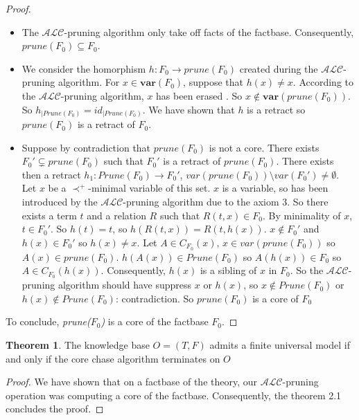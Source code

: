 \documentclass{article}
\theoremstyle{definition}
\newtheorem{theorem}{Theorem}[section]
\theoremstyle{remark}
\newcommand{\TodoDavid}[1]{\todo[color=green!40]{#1}}
\begin{document}
\begin{proof}
\begin{itemize}
\item The $\mathcal{ALC}$-pruning algorithm only take off facts of the factbase. Consequently, $\textit{prune}(F_0) \subseteq F_0$.
\item We consider the homorphism $h:F_0 \to \textit{prune}(F_0)$ created during the $\mathcal{ALC}$-pruning algorithm. For $x \in \textbf{var}(F_0)$, suppose that $h(x) \neq x$. According to the $\mathcal{ALC}$-pruning algorithm, $x$ has been erased \TodoDavid{à préciser}. So $x \notin \textbf{var}(\textit{prune}(F_0))$. So ${h}_{|\textit{Prune}(F_0)}=id_{|\textit{Prune}(F_0)}$. We have shown that $h$ is a retract so $\textit{prune}(F_0)$ is a retract of $F_0$.
\item Suppose by contradiction that $\textit{prune}(F_0)$ is not a core. There exists $F_0' \subsetneq \textit{prune}(F_0)$ such that $F_0'$ is a retract of $\textit{prune}(F_0)$. There exists then a retract $h_1: Prune(F_0) \to F_0'$, $var(prune(F_0))\setminus var(F_0') \neq \emptyset$. Let $x$ be a $\prec^+$-minimal variable of this set. $x$ is a variable, so has been introduced by the $\mathcal{ALC}$-pruning algorithm due to the axiom 3. So there exists a term $t$ and a relation $R$ such that $R(t,x) \in F_0$. By minimality of $x$, $t \in F_0'$. So $h(t) = t$, so $h(R(t,x)) = R(t,h(x))$. $x \notin F_0'$ and $h(x) \in F_0'$ so $h(x) \neq x$. Let $A \in C_{F_0}(x)$, $x \in var(prune(F_0))$ so $A(x) \in prune(F_0)$. $h(A(x)) \in Prune(F_0)$ so $A(h(x)) \in F_0$ so $A \in C_{F_0}(h(x))$. Consequently, $h(x)$ is a sibling of $x$ in $F_0$. So the $\mathcal{ALC}$-pruning algorithm should have suppress $x$ or $h(x)$, so $x \notin Prune(F_0)$ or $h(x) \notin Prune(F_0)$: contradiction. So $prune(F_0)$ is a core of $F_0$
\end{itemize}
To conclude, \emph{prune($F_0$)} is a core of the factbase $F_0$.
\end{proof}

\begin{theorem} 
The knowledge base $O = (T,F)$ admits a finite universal model if and only if the core chase algorithm terminates on $O$
\end{theorem}

\begin{proof}
We have shown that on a factbase of the theory, our $\mathcal{ALC}$-pruning operation was computing a core of the factbase. Consequently, the theorem 2.1 concludes the proof. 
\end{proof}




\end{document}
